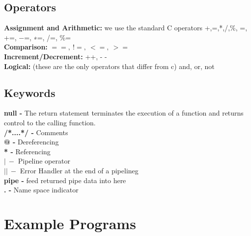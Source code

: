 \documentclass[11pt]{article}
\begin{document}
\subsection{Operators}

\begin{adjustwidth}{1cm}{}
\textbf{Assignment and Arithmetic:} we use the standard C operators +,=,*,/,\%, =, +=, −=, ∗=, /=, \%=\\
\textbf{Comparison:} $==,\ !=,\ <=,\ >=$ \\
\textbf{Increment/Decrement:} ++, - - \\
\textbf{Logical:} (these are the only operators that differ from c) and, or, not
\end{adjustwidth}

\subsection{ Keywords}
\begin{adjustwidth}{1cm}{}
\textbf {null -} The return statement terminates the execution of a function and returns control to the calling function.\\
\textbf{/*....*/ - } Comments \\ 
\textbf{@ - } Dereferencing \\ 
\textbf{* -} Referencing\\ 
$\mathbf{\vert \ -}$ Pipeline operator\\ 
$\mathbf{\vert \vert \ -}$  Error Handler at the end of a pipelineg\\
\textbf{pipe -} feed returned pipe data into here\\ 
\textbf{. -} Name space indicator\\
\end{adjustwidth}

\section{Example Programs}
\end{document}
